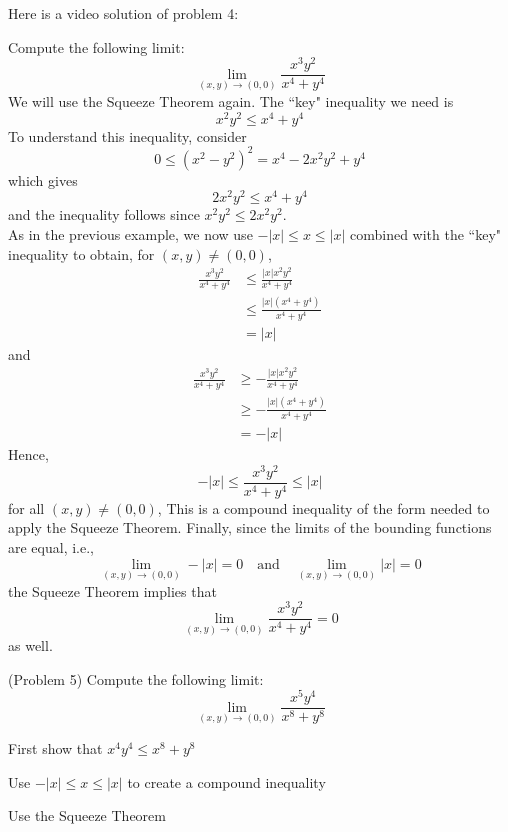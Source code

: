 \documentclass[handout]{ximera}
\begin{document}
Here is a video solution of problem 4:\\

\begin{foldable}
\end{foldable}


\begin{example}[Example 5]
Compute the following limit:
\[
\lim_{(x,y) \to (0,0)} \frac{x^3y^2}{x^4 + y^4}
\]
We will use the Squeeze Theorem again.  The ``key" inequality we need is
\[
x^2y^2 \leq x^4 + y^4 
\]
To understand this inequality, consider
\[
0 \leq (x^2 - y^2)^2 = x^4 -2x^2y^2 + y^4
\]
which gives
\[
2x^2y^2 \leq x^4 + y^4
\]
and the inequality follows since $x^2y^2 \leq 2x^2y^2$.\\

As in the previous example, we now use $-|x| \leq x \leq |x|$ 
combined with the ``key" inequality to obtain, for $(x,y) \neq (0,0)$,
\begin{align*}
\frac{x^3y^2}{x^4 + y^4} &\leq \frac{|x|x^2y^2}{x^4 + y^4}\\
 &\leq \frac{|x|(x^4 + y^4)}{x^4 + y^4}\\
 &= |x|
\end{align*}
and 
\begin{align*}
\frac{x^3y^2}{x^4 + y^4} &\geq -\frac{|x|x^2y^2}{x^4 + y^4} \\
&\geq -\frac{|x|(x^4 + y^4)}{x^4 + y^4}\\
& = -|x|
\end{align*}
Hence,
\[
-|x| \leq \frac{x^3y^2}{x^4 + y^4} \leq |x|
\]
for all $(x,y) \neq (0,0)$,
This is a compound inequality of the form needed to apply the Squeeze Theorem.
Finally, since the limits of the bounding functions are equal, i.e.,
\[
 \lim_{(x,y) \to (0,0)} -|x| = 0 \quad \text{and} \quad 
\lim_{(x,y) \to (0,0)} |x| = 0
\] 
the Squeeze Theorem  implies that
\[
\lim_{(x,y) \to (0,0)} \frac{x^3y^2}{x^4 + y^4} = 0
\]
as well.
\end{example}


\begin{problem}(Problem 5)
Compute the following limit:
\[
\lim_{(x,y) \to (0,0)} \frac{x^5y^4}{x^8 + y^8}
\]
\begin{hint}
First show that $x^4y^4 \leq x^8 + y^8$
\end{hint}
\begin{hint}
Use $-|x| \leq x \leq |x|$ to create a compound inequality
\end{hint}
\begin{hint}
Use the Squeeze Theorem
\end{hint}
\end{problem}
\end{document}
